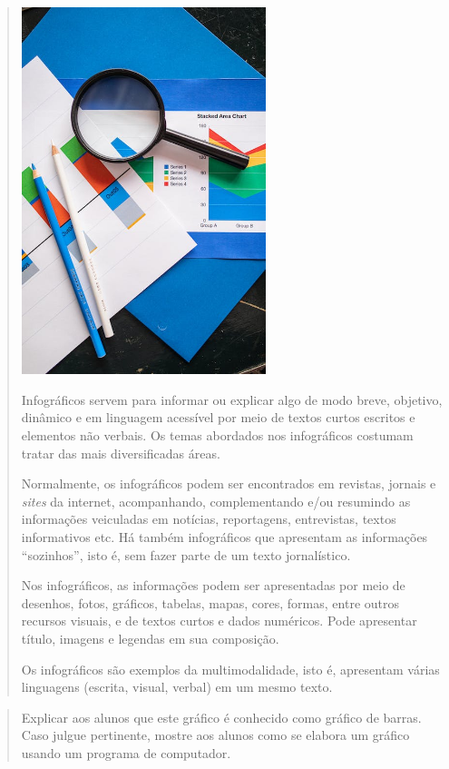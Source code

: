 \begin{escolha}
\begin{escolha}
{\begin{quote}
\includegraphics[width=2.81075in,height=4.21050in]{media/image29.jpeg}

Infográficos servem para informar ou explicar algo de modo breve,
objetivo, dinâmico e em linguagem acessível por meio de textos curtos
escritos e elementos não verbais. Os temas abordados nos infográficos
costumam tratar das mais diversificadas áreas.

Normalmente, os infográficos podem ser encontrados em revistas, jornais
e \emph{sites} da internet, acompanhando, complementando e/ou resumindo
as informações veiculadas em notícias, reportagens, entrevistas, textos
informativos etc. Há também infográficos que apresentam as informações
``sozinhos'', isto é, sem fazer parte de um texto jornalístico.

Nos infográficos, as informações podem ser apresentadas por meio de
desenhos, fotos, gráficos, tabelas, mapas, cores, formas, entre outros
recursos visuais, e de textos curtos e dados numéricos. Pode apresentar
título, imagens e legendas em sua composição.

Os infográficos são exemplos da multimodalidade, isto é, apresentam
várias linguagens (escrita, visual, verbal) em um mesmo texto.
\end{quote}


\begin{quote}
Explicar aos alunos que este gráfico é conhecido como gráfico de barras.
Caso julgue pertinente, mostre aos alunos como se elabora um gráfico
usando um programa de computador.
\end{quote}

}
\end{escolha}
\end{escolha}

